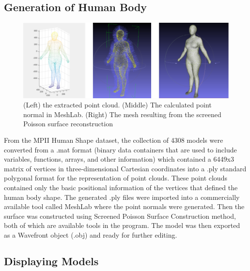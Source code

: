 \documentclass{article}
\begin{document}
    \subsection{Generation of Human Body}
    
    \begin{figure}[h]
        \centering
        \includegraphics[width=15cm]{images/humanModel.png}
        \caption{(Left) the extracted point cloud. (Middle) The calculated point normal in MeshLab. (Right) The mesh resulting from the screened Poisson surface reconstruction}
        \label{(Left) the extracted point cloud. (Middle) The calculated point normal in MeshLab. (Right) The mesh resulting from the screened Poisson surface reconstruction(Left) the extracted point cloud. (Middle) The calculated point normal in MeshLab. (Right) The mesh resulting from the screened Poisson surface reconstruction}
    \end{figure}
    From the MPII Human Shape dataset, the collection of 4308 models were converted from a .mat format (binary data containers that are used to include variables, functions, arrays, and other information) which contained a 6449x3 matrix of vertices in three-dimensional Cartesian coordinates into a .ply standard polygonal format for the representation of point clouds. These point clouds contained only the basic positional information of the vertices that defined the human body shape. The generated .ply files were imported into a commercially available tool called MeshLab where the point normals were generated. Then the surface was constructed using Screened Poisson Surface Construction method, both of which are available tools in the program. The model was then exported as a Wavefront object (.obj) and ready for further editing.
    
  
    
    
\subsection{Displaying Models}
\end{document}

